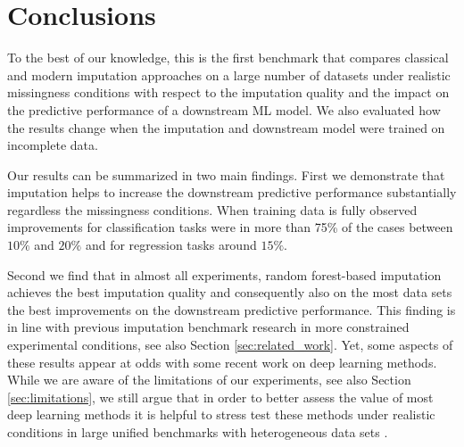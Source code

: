 \section{Conclusions}
\label{sec:conclusion}
%
To the best of our knowledge, this is the first benchmark that compares classical and modern imputation approaches on a large number of datasets under realistic missingness conditions with respect to the imputation quality and the impact on the predictive performance of a downstream ML model. We also evaluated how the results change when the imputation and downstream model were trained on incomplete data.

Our results can be summarized in two main findings. First we demonstrate that imputation helps to increase the downstream predictive performance substantially regardless the missingness conditions. When training data is fully observed improvements for classification tasks were in more than 75\% of the cases between $10\%$ and $20\%$ and for regression tasks around $15\%$.

Second we find that in almost all experiments, random forest-based imputation achieves the best imputation quality and consequently also on the most data sets the best improvements on the downstream predictive performance. This finding is in line with previous imputation benchmark research in more constrained experimental conditions, see also Section \ref{sec:related_work}. Yet, some aspects of these results appear at odds with some recent work on deep learning methods. While we are aware of the limitations of our experiments, see also Section \ref{sec:limitations}, we still argue that in order to better assess the value of most deep learning methods it is helpful to stress test these methods under realistic conditions in large unified benchmarks with heterogeneous data sets \citep{Sculley2018, Bender2021}.
